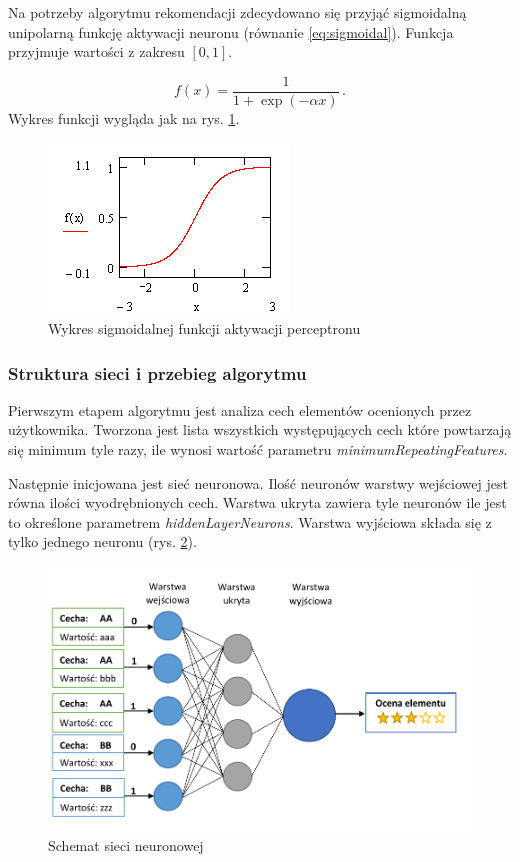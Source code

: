 \documentclass[twoside]{iisthesis}
\begin{document}
		 Na potrzeby algorytmu rekomendacji zdecydowano się przyjąć sigmoidalną unipolarną funkcję aktywacji neuronu (równanie \ref{eq:sigmoidal}). Funkcja przyjmuje wartości z zakresu $[0,1]$.
		 
		  \begin{equation}
		  \label{eq:sigmoidal}
		  f(x) = \frac{1}{1 + \exp(-\alpha x)}
		  \,.
		  \end{equation}
		 Wykres funkcji wygląda jak na rys. \ref{fig:sigmoid}.

 		 \begin{figure}[!ht] 
			\centering
			\includegraphics{sigmoid}
			\caption{Wykres sigmoidalnej funkcji aktywacji perceptronu \protect\cite{aforgenet}}
			\label{fig:sigmoid}
		 \end{figure}

		 \subsubsection{Struktura sieci i przebieg algorytmu}
		 
		 Pierwszym etapem algorytmu jest analiza cech elementów ocenionych przez użytkownika. Tworzona jest lista wszystkich występujących cech które powtarzają się minimum tyle razy, ile wynosi wartość  parametru \textit{minimumRepeatingFeatures}. 
		 
		 Następnie inicjowana jest sieć neuronowa. Ilość neuronów warstwy wejściowej jest równa ilości wyodrębnionych cech. Warstwa ukryta zawiera tyle neuronów ile jest to określone parametrem \textit{hiddenLayerNeurons}. Warstwa wyjściowa składa się z tylko jednego neuronu (rys. \ref{fig:siecneuronowa}). 
		 
		 \begin{figure}%
		 	\centering
		 	\includegraphics[width=1\textwidth]{siecneuronowa}
		 	\caption{Schemat sieci neuronowej}
		 	\label{fig:siecneuronowa}
		 \end{figure}
		 
\end{document}
